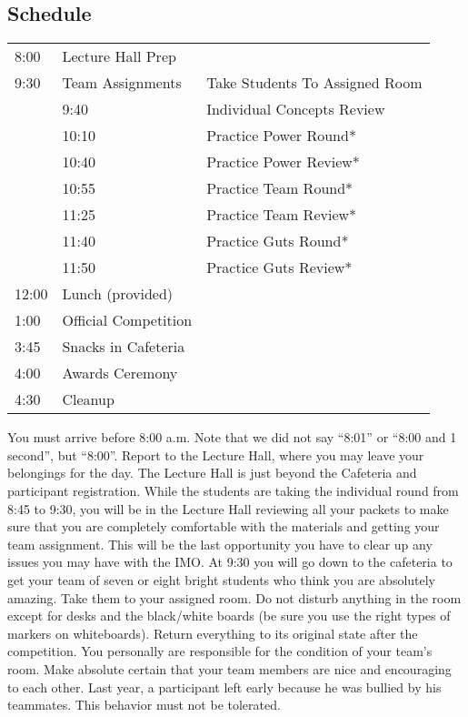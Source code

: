 \documentclass[11pt]{article}
\begin{document}
\begin{small}
\section{Schedule}
\begin{tabular}{l l l }
  8:00 & Lecture Hall Prep & \\
  9:30 & Team Assignments & Take Students To Assigned Room \\
  & 9:40 & Individual Concepts Review \\
  & 10:10 & Practice Power Round* \\
  & 10:40 & Practice Power Review* \\
  & 10:55 & Practice Team Round* \\
  & 11:25 & Practice Team Review* \\
  & 11:40 & Practice Guts Round* \\
  & 11:50 & Practice Guts Review* \\
 12:00 & Lunch (provided) \\
  1:00 & Official Competition \\
  3:45 & Snacks in Cafeteria \\
  4:00 & Awards Ceremony \\
  4:30 & Cleanup \\
\end{tabular}

\vspace{0.5cm}

\noindent You must arrive before 8:00 a.m. Note that we did not say ``8:01'' or ``8:00 and 1 second'', but ``8:00''. 
Report to the Lecture Hall, where you may leave your belongings for the day. The Lecture Hall is just beyond the Cafeteria and participant registration.
While the students are taking the individual round from 8:45 to 9:30, you will be in the Lecture Hall reviewing all your packets to make sure that you
are completely comfortable with the materials and getting your team assignment. This will be the last opportunity you have to clear up any issues you
may have with the IMO. At 9:30 you will go down to the cafeteria to get your team of seven or eight bright students who think you are absolutely amazing.
Take them to your assigned room. Do not disturb anything in the room except for desks and the black/white boards (be sure you use the right types
of markers on whiteboards). Return everything to its original state after the competition. You personally are responsible for the condition of your team's room.
Make absolute certain that your team members are nice and encouraging to each other. Last year, a participant left early because he was bullied by his teammates.
This behavior must not be tolerated.


\end{small}
\end{document}
